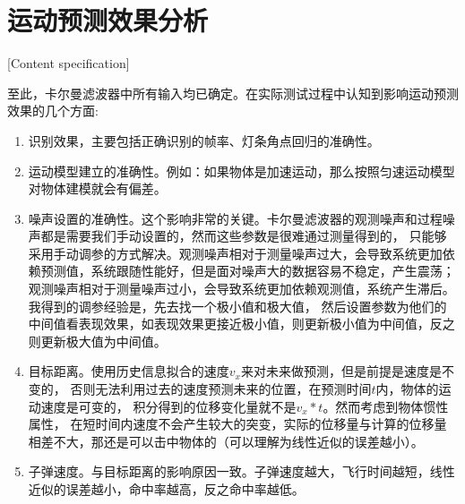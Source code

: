 




\section{运动预测效果分析}[Content specification]

至此，卡尔曼滤波器中所有输入均已确定。在实际测试过程中认知到影响运动预测效果的几个方面:
\begin{enumerate}[itemsep=2pt,topsep=0pt,parsep=0pt]
    \item 识别效果，主要包括正确识别的帧率、灯条角点回归的准确性。
    \item 运动模型建立的准确性。例如：如果物体是加速运动，那么按照匀速运动模型对物体建模就会有偏差。
    \item 噪声设置的准确性。这个影响非常的关键。卡尔曼滤波器的观测噪声和过程噪声都是需要我们手动设置的，然而这些参数是很难通过测量得到的，
    只能够采用手动调参的方式解决。观测噪声相对于测量噪声过大，会导致系统更加依赖预测值，系统跟随性能好，但是面对噪声大的数据容易不稳定，产生震荡；
    观测噪声相对于测量噪声过小，会导致系统更加依赖观测值，系统产生滞后。我得到的调参经验是，先去找一个极小值和极大值，
    然后设置参数为他们的中间值看表现效果，如表现效果更接近极小值，则更新极小值为中间值，反之则更新极大值为中间值。
    \item 目标距离。使用历史信息拟合的速度$v_x$来对未来做预测，但是前提是速度是不变的，
    否则无法利用过去的速度预测未来的位置，在预测时间$t$内，物体的运动速度是可变的，
    积分得到的位移变化量就不是$v_x*t$。然而考虑到物体惯性属性，
    在短时间内速度不会产生较大的突变，实际的位移量与计算的位移量相差不大，那还是可以击中物体的（可以理解为线性近似的误差越小）。
    \item 子弹速度。与目标距离的影响原因一致。子弹速度越大，飞行时间越短，线性近似的误差越小，命中率越高，反之命中率越低。

\end{enumerate}

